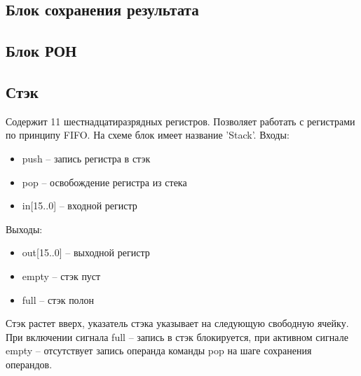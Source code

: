 \subsection{Блок сохранения результата}

\subsection{Блок РОН}

\subsection{Стэк}
Содержит 11 шестнадцатиразрядных регистров. Позволяет работать с регистрами по принципу FIFO. На схеме блок имеет название 'Stack'.
Входы:
\begin{itemize}
    \item push -- запись регистра в стэк
    \item pop -- освобождение регистра из стека
    \item in[15..0] -- входной регистр
\end{itemize}
Выходы:
\begin{itemize}
    \item out[15..0] -- выходной регистр
    \item empty -- стэк пуст
    \item full -- стэк полон
\end{itemize}
Стэк растет вверх, указатель стэка указывает на следующую свободную ячейку.
При включении сигнала full -- запись в стэк блокируется, при активном сигнале empty -- отсутствует запись операнда команды pop на шаге сохранения операндов.

